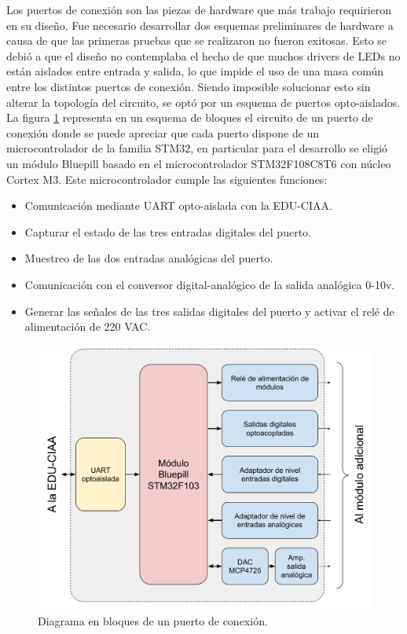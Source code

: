 Los puertos de conexión son las piezas de hardware que más trabajo requirieron en su diseño. Fue necesario desarrollar dos esquemas preliminares de hardware a causa de que las primeras pruebas que se realizaron no fueron exitosas. Esto se debió a que el diseño no contemplaba el hecho de que muchos drivers de LEDs no están aislados entre entrada y salida, lo que impide el uso de una masa común entre los distintos puertos de conexión. Siendo imposible solucionar esto sin alterar la topología del circuito, se optó por un esquema de puertos opto-aislados. La figura \ref{fig:BloquesPuerto} representa en un esquema de bloques el circuito de un puerto de conexión donde se puede apreciar que cada puerto dispone de un microcontrolador de la familia STM32, en particular para el desarrollo se eligió un módulo Bluepill basado en el microcontrolador STM32F108C8T6 con núcleo Cortex M3. Este microcontrolador cumple las siguientes funciones:

\begin{itemize}
	\item Comunicación mediante UART opto-aislada con la EDU-CIAA.
	\item Capturar el estado de las tres entradas digitales del puerto.
	\item Muestreo de las dos entradas analógicas del puerto.
	\item Comunicación con el conversor digital-analógico de la salida analógica 0-10v.
	\item Generar las señales de las tres salidas digitales del puerto y activar el relé de alimentación de 220 VAC.
\end{itemize}

\begin{figure}[ht]
	\centering
	\includegraphics[width=1\textwidth]{./Figures/BloquesPuerto.pdf}
	\caption{Diagrama en bloques de un puerto de conexión.}
	\label{fig:BloquesPuerto}
\end{figure}


